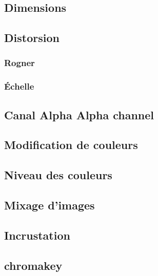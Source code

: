 \documentclass[
]{book}
\begin{document}
\hypertarget{dimensions}{%
\subsection{Dimensions}\label{dimensions}}

\hypertarget{distorsion}{%
\subsection{Distorsion}\label{distorsion}}

\hypertarget{rogner}{%
\subsubsection{Rogner}\label{rogner}}

\hypertarget{uxe9chelle}{%
\subsubsection{Échelle}\label{uxe9chelle}}

\hypertarget{canal-alpha-alpha-channel}{%
\subsection{Canal Alpha Alpha channel}\label{canal-alpha-alpha-channel}}

\hypertarget{modification-de-couleurs}{%
\subsection{Modification de couleurs}\label{modification-de-couleurs}}

\hypertarget{niveau-des-couleurs}{%
\subsection{Niveau des couleurs}\label{niveau-des-couleurs}}

\hypertarget{mixage-dimages}{%
\subsection{Mixage d'images}\label{mixage-dimages}}

\hypertarget{incrustation}{%
\subsection{Incrustation}\label{incrustation}}

\hypertarget{chromakey}{%
\subsection{chromakey}\label{chromakey}}
\end{document}

